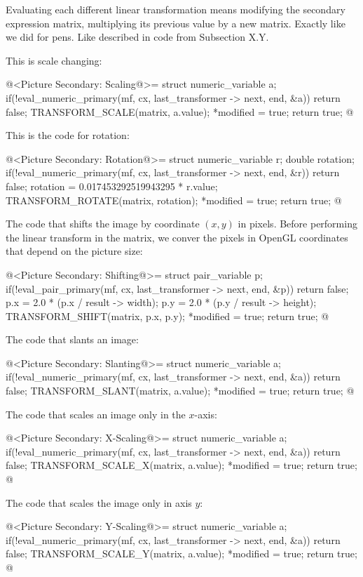 {{{{{Evaluating each different linear transformation means modifying the
secondary expression matrix, multiplying its previous value by a new
matrix. Exactly like we did for pens. Like described in code from
Subsection X.Y.

This is scale changing:

\iniciocodigo
@<Picture Secondary: Scaling@>=
struct numeric_variable a;
if(!eval_numeric_primary(mf, cx, last_transformer -> next, end, &a))
  return false;
TRANSFORM_SCALE(matrix, a.value);
*modified = true;
return true;
@
\fimcodigo

This is the code for rotation:

\iniciocodigo
@<Picture Secondary: Rotation@>=
struct numeric_variable r;
double rotation;
if(!eval_numeric_primary(mf, cx, last_transformer -> next, end, &r))
  return false;
rotation = 0.017453292519943295 * r.value;
TRANSFORM_ROTATE(matrix, rotation);
*modified = true;
return true;
@
\fimcodigo

The code that shifts the image by coordinate $(x, y)$ in
pixels. Before performing the linear transform in the matrix, we
conver the pixels in OpenGL coordinates that depend on the picture
size:

\iniciocodigo
@<Picture Secondary: Shifting@>=
struct pair_variable p;
if(!eval_pair_primary(mf, cx, last_transformer -> next, end, &p))
  return false;
p.x = 2.0 * (p.x / result -> width);
p.y = 2.0 * (p.y / result -> height);
TRANSFORM_SHIFT(matrix, p.x, p.y);
*modified = true;
return true;
@
\fimcodigo

The code that slants an image:

\iniciocodigo
@<Picture Secondary: Slanting@>=
struct numeric_variable a;
if(!eval_numeric_primary(mf, cx, last_transformer -> next, end, &a))
  return false;
TRANSFORM_SLANT(matrix, a.value);
*modified = true;
return true;
@
\fimcodigo

The code that scales an image only in the $x$-axis:

\iniciocodigo
@<Picture Secondary: X-Scaling@>=
struct numeric_variable a;
if(!eval_numeric_primary(mf, cx, last_transformer -> next, end, &a))
  return false;
TRANSFORM_SCALE_X(matrix, a.value);
*modified = true;
return true;
@
\fimcodigo

The code that scales the image only in axis $y$:

\iniciocodigo
@<Picture Secondary: Y-Scaling@>=
struct numeric_variable a;
if(!eval_numeric_primary(mf, cx, last_transformer -> next, end, &a))
  return false;
TRANSFORM_SCALE_Y(matrix, a.value);
*modified = true;
return true;
@
\fimcodigo

}}}}}
